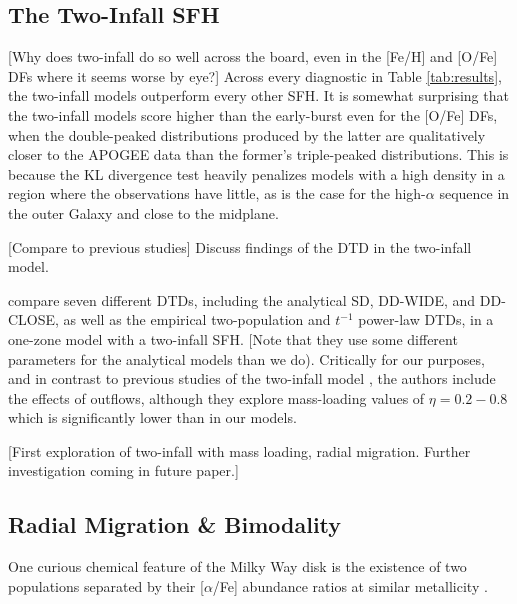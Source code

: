 \documentclass[twocolumn,twocolappendix,linenumbers,trackchanges]{aastex631}
\newcommand{\aFe}{[$\alpha$/Fe]\xspace}
\begin{document}
\subsection{The Two-Infall SFH}
\label{sec:two-infall-discussion}

[Why does two-infall do so well across the board, even in the [Fe/H] and [O/Fe] DFs where it seems worse by eye?]
Across every diagnostic in Table \ref{tab:results}, the two-infall models outperform every other SFH.
It is somewhat surprising that the two-infall models score higher than the early-burst even for the [O/Fe] DFs, when the double-peaked distributions produced by the latter are qualitatively closer to the APOGEE data than the former's triple-peaked distributions. This is because the KL divergence test heavily penalizes models with a high density in a region where the observations have little, as is the case for the high-$\alpha$ sequence in the outer Galaxy and close to the midplane. 

[Compare to previous studies]
Discuss \citet{Matteucci2006-BimodalDTDConsequences} findings of the \citet{Mannucci2006-TwoPopulations} DTD in the two-infall model.

\citet{Palicio2023-AnalyticDTD} compare seven different DTDs, including the analytical SD, DD-WIDE, and DD-CLOSE, as well as the empirical two-population and $t^{-1}$ power-law DTDs, in a one-zone model with a two-infall SFH. [Note that they use some different parameters for the analytical models than we do). Critically for our purposes, and in contrast to previous studies of the two-infall model \citep[e.g.,][others]{Chiappini1997-TwoInfall,Spitoni2021-TwoInfall}, the authors include the effects of outflows, although they explore mass-loading values of $\eta=0.2-0.8$ which is significantly lower than in our models.

[First exploration of two-infall with mass loading, radial migration. Further investigation coming in future paper.]

\subsection{Radial Migration \& Bimodality}

One curious chemical feature of the Milky Way disk is the existence of two populations separated by their \aFe abundance ratios at similar metallicity \citep[e.g.,][]{Bensby2014-solarNeighborhoodAbundances}. 
\end{document}

